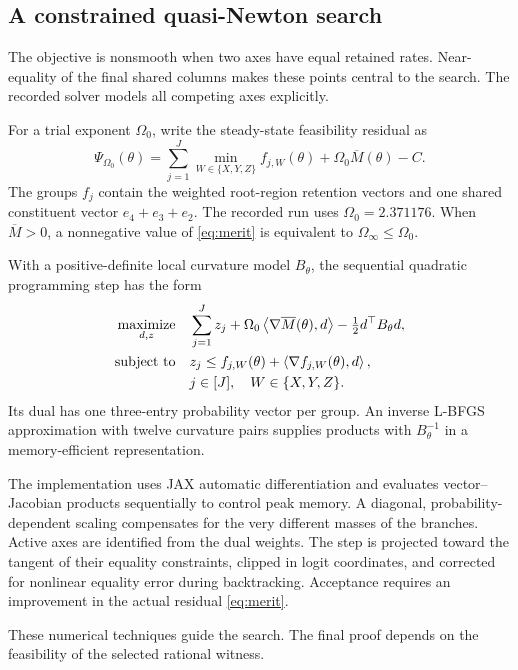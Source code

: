 \documentclass[11pt,a4paper]{article}
\newcommand{\Mbar}{\overline M}
\newcommand{\WW}{\{X,Y,Z\}}
\newcommand{\inner}[2]{\left\langle#1,#2\right\rangle}
\begin{document}
\subsection{A constrained quasi-Newton search}

The objective is nonsmooth when two axes have equal retained rates. Near-equality of the final shared columns makes these points central to the search. The recorded solver models all competing axes explicitly.

For a trial exponent $\Omega_0$, write the steady-state feasibility residual as
\begin{equation}\label{eq:merit}
\Psi_{\Omega_0}(\theta)
=\sum_{j=1}^{J}\min_{W\in\WW}f_{j,W}(\theta)
 +\Omega_0\Mbar(\theta)-C.
\end{equation}
The groups $f_j$ contain the weighted root-region retention vectors and one shared constituent vector $e_4+e_3+e_2$. The recorded run uses $\Omega_0=2.371176$. When $\Mbar>0$, a nonnegative value of \cref{eq:merit} is equivalent to $\Omega_\infty\le\Omega_0$.

With a positive-definite local curvature model $B_\theta$, the sequential quadratic programming step has the form
\begin{equation}\label{eq:sqp}
\begin{aligned}
\underset{d,z}{\operatorname{maximize}}\quad&
  \sum_{j=1}^{J}z_j+
  \Omega_0\inner{\nabla\Mbar(\theta)}{d}
  -\tfrac12 d^\top B_\theta d,\\
\text{\normalfont subject to}\quad&
 z_j\le f_{j,W}(\theta)+\inner{\nabla f_{j,W}(\theta)}{d},\\
& j\in[J],\quad W\in\WW.
\end{aligned}
\end{equation}
Its dual has one three-entry probability vector per group. An inverse L-BFGS approximation with twelve curvature pairs supplies products with $B_\theta^{-1}$ in a memory-efficient representation.

The implementation uses JAX automatic differentiation and evaluates vector--Jacobian products sequentially to control peak memory. A diagonal, probability-dependent scaling compensates for the very different masses of the branches. Active axes are identified from the dual weights. The step is projected toward the tangent of their equality constraints, clipped in logit coordinates, and corrected for nonlinear equality error during backtracking. Acceptance requires an improvement in the actual residual \cref{eq:merit}.

These numerical techniques guide the search. The final proof depends on the feasibility of the selected rational witness.
\end{document}
